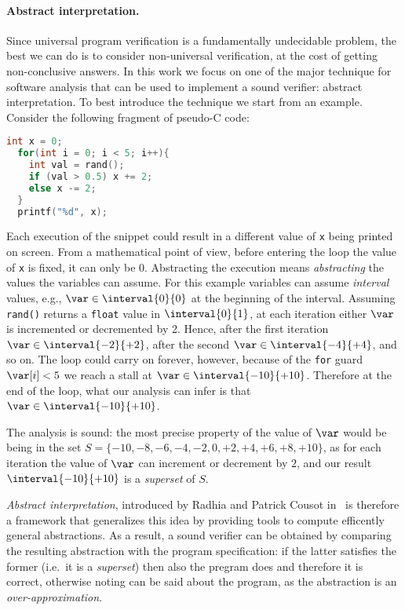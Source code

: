 \paragraph*{Abstract interpretation.} Since universal program
verification is a fundamentally undecidable problem, the best we can
do is to consider non-universal verification, at the cost of getting
non-conclusive answers. In this work we focus on one of the major
technique for software analysis that can be used to implement a sound
verifier: abstract interpretation. To best introduce the technique we
start from an example. Consider the following fragment of pseudo-C
code:

\begin{lstlisting}[language=C, label=codeexample, caption=Incrementing or decrementing randomly]
  int x = 0;
  for(int i = 0; i < 5; i++){
    int val = rand();
    if (val > 0.5) x += 2;
    else x -= 2;
  }
  printf("%d", x);
\end{lstlisting}

Each execution of the snippet could result in a different value of
\texttt{x} being printed on screen. From a mathematical point of view,
before entering the loop the value of \texttt{x} is fixed, it can only
be \(0\). Abstracting the execution means \emph{abstracting} the
values the variables can assume. For this example variables can assume
\emph{interval} values, e.g., \(\var \in \interval{0}{0}\) at the
beginning of the interval. Assuming \texttt{rand()} returns a
\texttt{float} value in \(\interval{0}{1}\), at each iteration either
\(\var\) is incremented or decremented by 2. Hence, after the first
iteration \(\var \in \interval{-2}{+2}\), after the second
\(\var \in \interval{-4}{+4}\), and so on. The loop could carry on
forever, however, because of the \texttt{for} guard \(\var[i] < 5\) we
reach a stall at \(\var \in \interval{-10}{+10}\). Therefore at the end
of the loop, what our analysis can infer is that
\(\var \in \interval{-10}{+10}\).

\medskip

\noindent
The analysis is sound: the most precise property of the value of
\(\var\) would be being in the set
\({S = \{-10, -8, -6, -4, -2, 0, +2, +4, +6, +8, +10\}}\), as for each
iteration the value of \(\var\) can increment or decrement by \(2\),
and our result \(\interval{-10}{+10}\) is a \emph{superset} of \(S\).

\medskip

\noindent
\emph{Abstract interpretation}, introduced by Radhia and Patrick
Cousot in~\cite{patrickradhia:one, patrickradhia:two} is therefore a
framework that generalizes this idea by providing tools to compute
efficently general abstractions. As a result, a sound verifier can be
obtained by comparing the resulting abstraction with the program
specification: if the latter satisfies the former (i.e.\ it is a
\emph{superset}) then also the pregram does and therefore it is
correct, otherwise noting can be said about the program, as the
abstraction is an \emph{over-approximation}.

